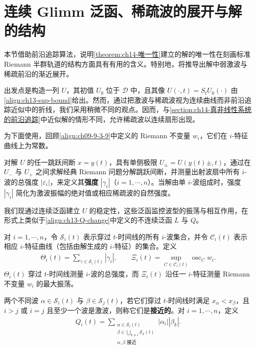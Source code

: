 \documentclass[../../main.tex]{subfiles}
\begin{document}
\section{连续 Glimm 泛函、稀疏波的展开与解的结构}\label{section:ch14-连续glimm泛函与稀疏波展开}

本节借助前沿追踪算法，说明\cref{theorem:ch14-唯一性}建立的解的唯一性在刻画标准 Riemann 半群轨道的结构方面具有有用的含义。特别地，将推导出解中弱激波与稀疏前沿的渐近展开。

出发点是构造一列 $U$，其初值 $U_0$ 位于 $\mathscr{D}$ 中，且其像 $U(\cdot,t)=S_tU_0(\cdot)$ 由\eqref{align:ch13-sup-bound}给出。然而，通过把激波与稀疏波视为连续曲线而非前沿追踪近似中的折线，我们采用稍微不同的观点。因而，与\cref{section:ch14-真非线性系统的前沿追踪}中近似解的情形不同，允许稀疏波以连续扇形出现。



为下面使用，回顾\eqref{align:ch09-9-3-9}中定义的 Riemann 不变量 $w_i$，它们在 $i$-特征曲线上为常数。



对解 $U$ 的任一跳跃间断 $x=y(t)$，具有单侧极限 $U_\pm=U(y(t)\pm,t)$，通过在 $U_-$ 与 $U_+$ 之间求解经典 Riemann 问题分解跳跃间断，并测量出射波扇中所有 $i$-波的总强度 $|\varepsilon_i|$，来定义其\textbf{强度} $|\gamma_i|$（$i=1,\cdots,n$）。当解由单 $i$-波组成时，强度 $|\gamma_i|$ 简化为激波振幅的绝对值或相应稀疏波的自然强度。

我们现通过连续泛函建立 $U$ 的稳定性，这些泛函监控波型的振荡与相互作用，在形式上类似于\eqref{align:ch13-Q-change}中定义的不连续泛函 $L$ 与 $Q$。



对 $i=1,\cdots,n$，令 $\mathscr{S}_i(t)$ 表示穿过 $t$-时间线的所有 $i$-波集合，并令 $\mathscr{C}_i(t)$ 表示相应 $i$-特征曲线（包括由解生成的 $i$-特征）的集合。定义
\begin{align}
\Theta_i(t)=\sum_{\gamma\in\mathscr{S}_i(t)}|\gamma_i|,\qquad \Xi_i(t)=\sup_{C\in\mathscr{C}_i(t)}\operatorname{osc}_C w_i.
\label{align:ch14-ThetaXi}
\end{align}
$\Theta_i(t)$ 穿过 $t$-时间线测量 $i$-波的总强度，而 $\Xi_i(t)$ 沿任一 $i$-特征测量 Riemann 不变量 $w_i$ 的最大振荡。

两个不同波 $\alpha\in\mathscr{S}_i(t)$ 与 $\beta\in\mathscr{S}_j(t)$，若它们穿过 $t$-时间线时满足 $x_\alpha<x_\beta$，且 $i>j$ 或 $i=j$ 且至少一个波是激波，则称它们是\textbf{接近的}。对 $i=1,\cdots,n$，定义
\begin{align}
Q_i(t)=\sum_{\substack{\alpha\in\mathscr{S}_i(t)\\ \beta\in\bigcup_{k\neq i}\mathscr{S}_k(t)\\ \alpha,\beta\text{ 接近}}}|\alpha_i||\beta_k|.
\label{align:ch14-Qi}
\end{align}
\end{document}
